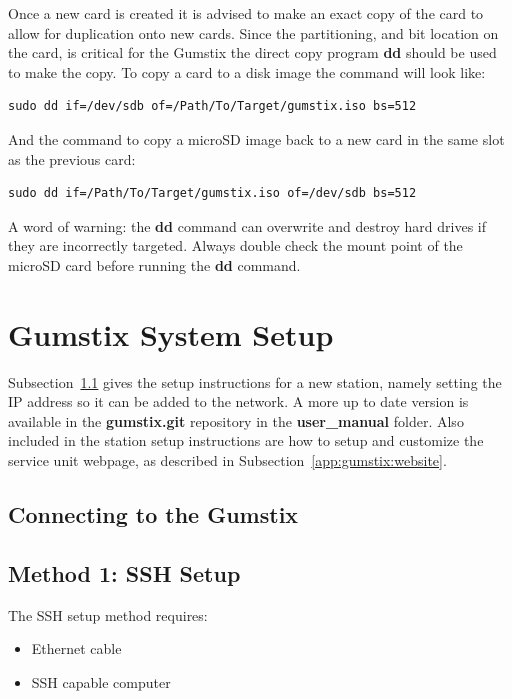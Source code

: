 Once a new card is created it is advised to make an exact copy of the card to allow for duplication onto new cards.
Since the partitioning, and bit location on the card, is critical for the Gumstix the direct copy program {\bf dd} should be used to make the copy.
To copy a card to a disk image the command will look like:

\begin{verbatim}
sudo dd if=/dev/sdb of=/Path/To/Target/gumstix.iso bs=512
\end{verbatim}

And the command to copy a microSD image back to a new card in the same slot as the previous card:

\begin{verbatim}
sudo dd if=/Path/To/Target/gumstix.iso of=/dev/sdb bs=512
\end{verbatim}

A word of warning: the {\bf dd} command can overwrite and destroy hard drives if they are incorrectly targeted.
Always double check the mount point of the microSD card before running the {\bf dd} command.

\section{Gumstix System Setup}

Subsection~\ref{app:appendix:setup} gives the setup instructions for a new station, namely setting the IP address so it can be added to the network.
A more up to date version is available in the {\bf gumstix.git} repository in the {\bf user\_manual} folder.
Also included in the station setup instructions are how to setup and customize the service unit webpage, as described in Subsection~\ref{app:gumstix:website}.

\subsection{Connecting to the Gumstix}
\label{app:appendix:setup} 

\subsection*{Method 1: SSH Setup}
The SSH setup method requires:
\begin{itemize}
\item{Ethernet cable}
\item{SSH capable computer}
\end{itemize}

